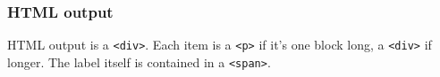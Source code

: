 \begin{Shaded}
\begin{Highlighting}[]
\NormalTok{\{}\NormalTok{\}}

\NormalTok{[(Premise 1)]}


\NormalTok{[(Premise 2)]}


\NormalTok{[(Conclusion)]}


\NormalTok{\{}\NormalTok{\}}
\end{Highlighting}
\end{Shaded}

\hypertarget{html-output}{%
\subsubsection{HTML output}\label{html-output}}

HTML output is a \texttt{\textless{}div\textgreater{}}. Each item is a
\texttt{\textless{}p\textgreater{}} if it's one block long, a
\texttt{\textless{}div\textgreater{}} if longer. The label itself is
contained in a \texttt{\textless{}span\textgreater{}}.

